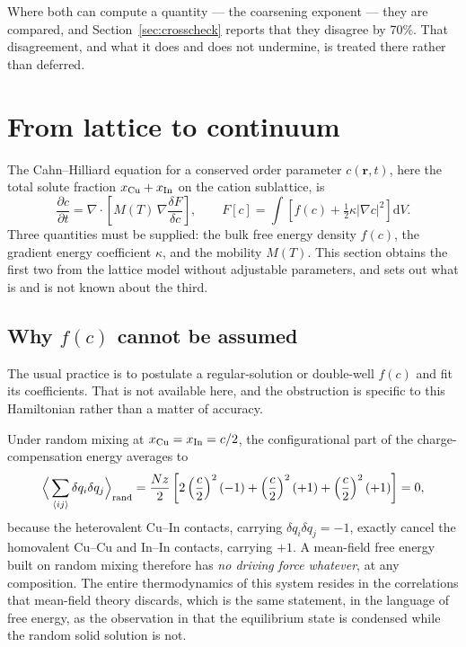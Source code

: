 \documentclass[11pt,a4paper]{article}
\begin{document}
Where both can compute a quantity --- the coarsening exponent --- they are
compared, and Section~\ref{sec:crosscheck} reports that they disagree by 70\%.
That disagreement, and what it does and does not undermine, is treated there
rather than deferred.

\section{From lattice to continuum}
\label{sec:bridge}

The Cahn--Hilliard equation \citep{cahn1958} for a conserved order parameter
$c(\mathbf{r}, t)$,
here the total solute fraction $x_{\rm Cu} + x_{\rm In}$ on the cation
sublattice, is
\begin{equation}
\frac{\partial c}{\partial t}
  = \nabla \cdot \left[ M(T)\, \nabla \frac{\delta F}{\delta c} \right],
\qquad
F[c] = \int \left[ f(c) + \tfrac{1}{2}\kappa \left|\nabla c\right|^2 \right] \mathrm{d}V .
\label{eq:ch}
\end{equation}
Three quantities must be supplied: the bulk free energy density $f(c)$, the
gradient energy coefficient $\kappa$, and the mobility $M(T)$. This section
obtains the first two from the lattice model without adjustable parameters, and
sets out what is and is not known about the third.

\subsection{Why $f(c)$ cannot be assumed}
\label{sec:whynotregular}

The usual practice is to postulate a regular-solution or double-well $f(c)$ and
fit its coefficients. That is not available here, and the obstruction is
specific to this Hamiltonian rather than a matter of accuracy.

Under random mixing at $x_{\rm Cu} = x_{\rm In} = c/2$, the configurational part
of the charge-compensation energy averages to
\begin{equation}
\Big\langle \sum_{\langle ij \rangle} \delta q_i \delta q_j \Big\rangle_{\rm rand}
= \frac{Nz}{2}\left[ 2\left(\frac{c}{2}\right)^2(-1)
                   + \left(\frac{c}{2}\right)^2(+1)
                   + \left(\frac{c}{2}\right)^2(+1) \right] = 0,
\label{eq:mfzero}
\end{equation}
because the heterovalent Cu--In contacts, carrying $\delta q_i \delta q_j = -1$,
exactly cancel the homovalent Cu--Cu and In--In contacts, carrying $+1$. A
mean-field free energy built on random mixing therefore has \emph{no driving
force whatever}, at any composition. The entire thermodynamics of this system
resides in the correlations that mean-field theory discards, which is the same
statement, in the language of free energy, as the observation in
\citet{yu2026b} that the equilibrium state is condensed while the random solid
solution is not.
\end{document}
